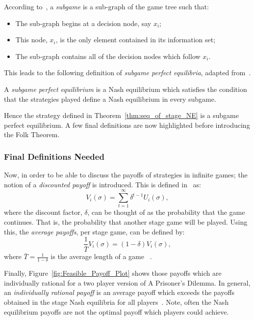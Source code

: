 According to~\cite{Webb2007}, a \textit{subgame} is a sub-graph of the game tree
such that:
\begin{itemize}
    \item The sub-graph begins at a decision node, say \(x_{i}\);
    \item This node, \(x_{i}\), is the only element contained in its information set;
    \item The sub-graph contains all of the decision nodes which follow \(x_{i}\).
\end{itemize}

This leads to the following definition of \emph{subgame perfect equilibria},
adapted from~\cite{Webb2007}.
\begin{definition}
    A \textit{subgame perfect equilibrium} is a Nash equilibrium which satisfies
    the condition that the strategies played define a Nash equilibrium in every
    subgame.
\end{definition}
Hence the strategy defined in Theorem~\ref{thm:seq_of_stage_NE} is a subgame
perfect equilibrium. A few final definitions are now highlighted before
introducing the Folk Theorem.

\subsubsection{Final Definitions Needed}\label{subsubsec:Final_Defs_Needed}
Now, in order to be able to discuss the payoffs of strategies in infinite games;
the notion of a \emph{discounted payoff} is introduced. This is defined
in~\cite{Knight2017b} as:
\[
    V_{i}(\sigma) = \sum_{t=1}^{\infty}{\delta^{t-1}U_{i}(\sigma)},
\]
where the discount factor, \(\delta \), can be thought of as the probability
that the game continues. That is, the probability that another stage game will
be played. Using this, the \textit{average payoffs}, per stage game, can be defined by:
\[
    \frac{1}{\bar{T}}V_{i}(\sigma) = (1-\delta)V_{i}(\sigma),
\]
where \(\bar{T} = \frac{1}{1-\delta}\) is the average length of a game
~\cite{Knight2017b}.

Finally, Figure~\ref{fig:Feasible_Payoff_Plot} shows those payoffs which are
individually rational for a two player version of A Prisoner's Dilemma. In
general, an \textit{individually rational payoff} is an average payoff which
exceeds the payoffs obtained in the stage Nash equilibria for all
players~\cite{Knight2017b}. Note, often the Nash equilibrium payoffs are not the
optimal payoff which players could achieve.

